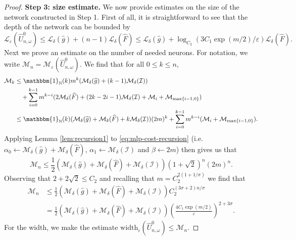 \documentclass{article}
\numberwithin{equation}{section}
\newcommand{\width}{\mathrm{width}}
\newcommand{\N}{\mathbb{N}}
\newcommand{\cI}{\mathcal{I}}
\newcommand{\cL}{\mathcal{L}}
\newcommand{\cM}{\mathcal{M}}
\renewcommand{\epsilon}{\varepsilon}
\newcommand{\1}{\mathbbm{1}}
\newcommand{\Fhat}{\widehat{F}}
\newcommand{\Uhat}{\widehat{U}}
\newcommand{\ghat}{\widehat{g}}
\newcommand{\bigO}{\mathcal{O}}
\newtheorem{remark}[theorem]{Remark}
\begin{document}
\begin{proof}
\textbf{Step 3: size estimate. }
We now provide estimates on the size of the network constructed in Step 1. 
First of all, it is straightforward to see that the depth of the network can be bounded by
\begin{equation}\label{eq:L-nn}
     \cL_\epsilon(\Uhat^0_{n,\omega}) \leq \cL_\delta(\ghat)+(n-1)\cL_\delta(\Fhat) \leq \cL_{\delta}(\ghat)+\log_{C_2} (3C_1\exp(m/2)/\epsilon)\cL_\delta(\Fhat). 
\end{equation}
Next we prove an estimate on the number of needed neurons. For notation, we write $\cM_{n} = \cM_\epsilon(\Uhat^0_{n,\omega})$. We find that for all $0\leq k\leq n$,
\begin{equation}\label{eq:mlp-cost-recursion}
\begin{split}
    \cM_k &\leq \1_\N(k) m^k (\cM_\delta(\ghat)+(k-1)\cM_\delta(\cI)) \\
    &\quad+ \sum_{i=0}^{k-1} m^{k-i} (2\cM_\delta(\Fhat) + (2k-2i-1)\cM_\delta(\cI)+ \cM_i + \cM_{\max\{i-1,0\}})\\
    &\leq \1_\N(k)(\cM_\delta(\ghat)+ \cM_\delta(\Fhat)+k\cM_\delta(\cI))(2m)^k+ \sum_{i=0}^{k-1} m^{k-i} (\cM_i + \cM_{\max\{i-1,0\}}).
\end{split}
\end{equation}
Applying Lemma \ref{lem:recursion1} to \eqref{eq:mlp-cost-recursion} (i.e. $\alpha_0\leftarrow \cM_\delta(\ghat)+\cM_\delta(\Fhat)$, $\alpha_1\leftarrow \cM_\delta(\cI)$ and $\beta\leftarrow 2m$) then gives us that
\begin{equation}\label{eq:M-nn}
    \cM_n \leq \frac{1}{2}(\cM_\delta(\ghat)+ \cM_\delta(\Fhat)+ \cM_\delta(\cI)) (1+ \sqrt{2} )^n (2m)^n. 
\end{equation}
Observing that $2+2\sqrt{2} \leq C_2$ and recalling that $m=C_2^{2(1+1/\sigma)}$ we find that
\begin{equation}
\begin{split}
    \cM_n &\leq \frac{1}{2}(\cM_\delta(\ghat)+ \cM_\delta(\Fhat)+ \cM_\delta(\cI)) C_2^{(3\sigma+2)n/\sigma}\\
    &= \frac{1}{2}(\cM_\delta(\ghat)+ \cM_\delta(\Fhat)+ \cM_\delta(\cI)) \left(\frac{4C_1\exp(m/2)}{\epsilon}\right)^{2+3\sigma}. 
\end{split}
\end{equation}
For the width, we make the estimate $\width_\epsilon(\Uhat^0_{n,\omega}) \leq \cM_n$. 

\end{proof}

\end{document}
